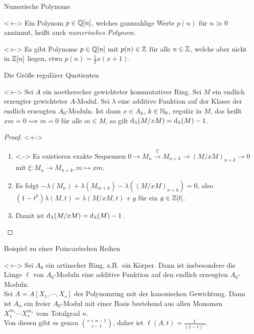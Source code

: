 \begin{frame}{Numerische Polynome}
	\begin{remark}<+->
		Ein Polynom \(p \in \mathbb Q[n]\), welches ganzzahlige Werte \(p(n)\) für
		\(n \gg 0\) annimmt, heißt auch \emph{numerisches Polynom}.
	\end{remark}
	\begin{example}<+->
		Es gibt Polynome \(p \in \mathbb Q[n]\) mit \(p(n) \in \mathbb Z\) für alle
		\(n \in \mathbb Z\), welche aber nicht in \(\mathbb Z[n]\) liegen, etwa
		\(p(n) = \frac 1 2 x(x + 1)\).
	\end{example}
\end{frame}

\begin{frame}{Die Größe regulärer Quotienten}
	\begin{proposition}<+->
		Sei \(A\) ein noetherscher gewichteter kommutativer Ring. Sei
		\(M\) ein endlich erzeugter gewichteter \(A\)-Modul. Sei \(\lambda\) eine additive
		Funktion auf der Klasse der endlich erzeugten \(A_0\)-Moduln. Ist dann
		\(x \in A_k\), \(k \in \mathbb N_0\), regulär in \(M\), das heißt
		\(x m = 0 \implies m = 0\) für alle \(m \in M\), so gilt
		\(\operatorname{d}_\lambda(M/x M) = \operatorname{d}_\lambda(M) - 1\).
	\end{proposition}
	\begin{proof}<+->
		\begin{enumerate}[<+->]
		\item<.->
			Es existieren exakte Sequenzen \(0 \to M_n \xrightarrow{\xi} 
			M_{n + k} \to (M/x M)_{n + k} \to 0\) mit \(\xi\colon M_n \to M_{n + k},
			m \mapsto x m\).
		\item
			Es folgt \(- \lambda(M_n) + \lambda(M_{m + k}) - \lambda((M/xM)_{n + k}) = 0\),
			also \((1 - t^k) \lambda(M, t) = \lambda(M/xM, t) + g\) für ein \(g \in \mathbb Z[t]\).
		\item
			Damit ist \(\operatorname{d}_\lambda(M/x M) = \operatorname{d}_\lambda(M) - 1\).
			\qedhere
		\end{enumerate}
	\end{proof}
\end{frame}

\begin{frame}{Beispiel zu einer Poincaréschen Reihen}
	\begin{example}<+->
		Sei \(A_0\) ein artinscher Ring, z.B.\ ein Körper. Dann ist insbesondere die Länge \(\ell\) von
		\(A_0\)-Moduln eine additive Funktion auf den endlich erzeugten \(A_0\)-Moduln.
		\\
		Sei \(A = A[X_1, \dotsb, X_s]\) der Polynomring mit der kanonischen Gewichtung.
		Dann ist \(A_n\) ein freier \(A_0\)-Modul mit einer Basis bestehend
		aus allen Monomen \(X_1^{m_1} \dotsm X_s^{m_s}\) vom Totalgrad \(n\).
		\\
		Von diesen gibt es genau \(\binom{s + n - 1}{s - 1}\), daher ist
		\(\ell(A, t) = \frac{1}{(1 - t)^s}\).
	\end{example}
\end{frame}


